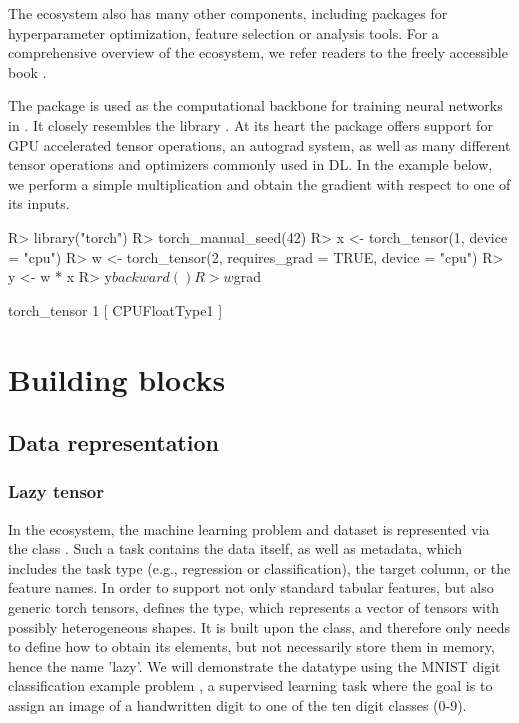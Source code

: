 \documentclass[article]{jss}
\theoremstyle{definition}
\begin{document}
The  ecosystem also has many other components, including packages for hyperparameter optimization, feature selection or analysis tools.
For a comprehensive overview of the  ecosystem, we refer readers to the freely accessible book \citep{ref-mlr3book}.

The  package is used as the computational backbone for training neural networks in .
It closely resembles the \pytorch{} \python{} library \citep{ref-pytorch}.
At its heart the package offers support for GPU accelerated tensor operations, an autograd system, as well as many different tensor operations and optimizers commonly used in DL.
In the example below, we perform a simple multiplication and obtain the gradient with respect to one of its inputs.

\begin{CodeInput}
R> library("torch")
R> torch_manual_seed(42)
R> x <- torch_tensor(1, device = "cpu")
R> w <- torch_tensor(2, requires_grad = TRUE, device = "cpu")
R> y <- w * x
R> y$backward()
R> w$grad
\end{CodeInput}
\begin{CodeOutput}
torch_tensor
 1
[ CPUFloatType{1} ]
\end{CodeOutput}

\section{Building blocks}\label{sec:building-blocks}

\subsection{Data representation}

\subsubsection{Lazy tensor}

In the  ecosystem, the machine learning problem and dataset is represented via the  class .
Such a task contains the data itself, as well as metadata, which includes the task type (e.g., regression or classification), the target column, or the feature names.
In order to support not only standard tabular features, but also generic torch tensors,  defines the  type, which represents a vector of tensors with possibly heterogeneous shapes.
It is built upon the  class, and therefore only needs to define how to obtain its elements, but not necessarily store them in memory, hence the name 'lazy'.
We will demonstrate the datatype using the MNIST digit classification example problem \citep{ref-mnist-2012}, a supervised learning task where the goal is to assign an image of a handwritten digit to one of the ten digit classes (0-9).
\end{document}
